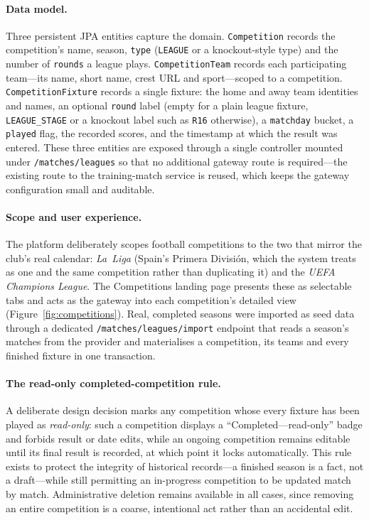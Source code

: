 \paragraph{Data model.} Three persistent JPA entities capture the domain.
\texttt{Competition} records the competition's name, season, \texttt{type}
(\texttt{LEAGUE} or a knockout-style type) and the number of \texttt{rounds} a league
plays. \texttt{CompetitionTeam} records each participating team---its name, short name,
crest URL and sport---scoped to a competition. \texttt{CompetitionFixture} records a
single fixture: the home and away team identities and names, an optional \texttt{round}
label (empty for a plain league fixture, \texttt{LEAGUE\_STAGE} or a knockout label such
as \texttt{R16} otherwise), a \texttt{matchday} bucket, a \texttt{played} flag, the
recorded scores, and the timestamp at which the result was entered. These three entities
are exposed through a single controller mounted under \texttt{/matches/leagues} so that
no additional gateway route is required---the existing route to the training-match service
is reused, which keeps the gateway configuration small and auditable.

\paragraph{Scope and user experience.} The platform deliberately scopes football
competitions to the two that mirror the club's real calendar: \emph{La~Liga} (Spain's
Primera Divisi\'on, which the system treats as one and the same competition rather than
duplicating it) and the \emph{UEFA Champions League}. The Competitions landing page
presents these as selectable tabs and acts as the gateway into each competition's detailed
view (Figure~\ref{fig:competitions}). Real, completed seasons were imported as seed data
through a dedicated \texttt{/matches/leagues/import} endpoint that reads a season's matches
from the provider and materialises a competition, its teams and every finished fixture in
one transaction.

\paragraph{The read-only completed-competition rule.} A deliberate design decision marks
any competition whose every fixture has been played as \emph{read-only}: such a
competition displays a ``Completed---read-only'' badge and forbids result or date edits,
while an ongoing competition remains editable until its final result is recorded, at which
point it locks automatically. This rule exists to protect the integrity of historical
records---a finished season is a fact, not a draft---while still permitting an in-progress
competition to be updated match by match. Administrative deletion remains available in all
cases, since removing an entire competition is a coarse, intentional act rather than an
accidental edit.

